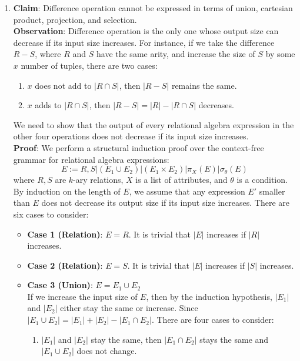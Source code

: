 \begin{enumerate}
  \item \textbf{Claim}: Difference operation cannot be expressed in terms of union, cartesian product, projection, and selection. \\
  \textbf{Observation}: Difference operation is the only one whose output size can decrease if its input size increases. For instance, 
  if we take the difference $R - S$, where $R$ and $S$ have the same arity, and increase the size of $S$ by some $x$ number of tuples, 
  there are two cases:
  \begin{enumerate}
    \item $x$ does not add to $|R \cap S|$, then $|R - S|$ remains the same.
    \item $x$ adds to $|R \cap S|$, then $|R - S| = |R| - |R \cap S|$ decreases.
  \end{enumerate}
  We need to show that the output of every relational algebra expression in the other four operations does not decrease if its input 
  size increases. \\ 
  \textbf{Proof}: We perform a structural induction proof over the context-free grammar for relational algebra expressions:
  \begin{equation*}
    E := R, S | (E_1 \cup E_2) | (E_1 \times E_2) | \pi_{X}(E) | \sigma_{\theta}(E)
  \end{equation*}
  where $R, S$ are $k$-ary relations, $X$ is a list of attributes, and $\theta$ is a condition. By induction on the length of $E$, 
  we assume that any expression $E'$ smaller than $E$ does not decrease its output size if its input size increases. There are 
  six cases to consider: 
  \begin{itemize}
    \item \textbf{Case 1 (Relation)}: $E = R$. It is trivial that $|E|$ increases if $|R|$ increases.
    \item \textbf{Case 2 (Relation)}: $E = S$. It is trivial that $|E|$ increases if $|S|$ increases.
    \item \textbf{Case 3 (Union)}: $E = E_1 \cup E_2$ \\
    If we increase the input size of $E$, then by the induction hypothesis, $|E_1|$ and $|E_2|$ either stay the same or increase. Since 
    $|E_1 \cup E_2| = |E_1| + |E_2| - |E_1 \cap E_2|$. There are four cases to consider:
    \begin{enumerate} 
      \item $|E_1|$ and $|E_2|$ stay the same, then $|E_1 \cap E_2|$ stays the same and $|E_1 \cup E_2|$ does not change.

\end{enumerate}
\end{itemize}
\end{enumerate}
